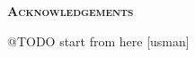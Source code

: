 % 
% 
% 




\newpage
\thispagestyle{empty}

\clearpage
\cleardoublepage
{}

\pagestyle{plain}

{}


\vspace*{\fill}

\begin{center}
    \large \textbf{\textsc{Acknowledgements}}
\end{center}

@TODO start from here [usman]

